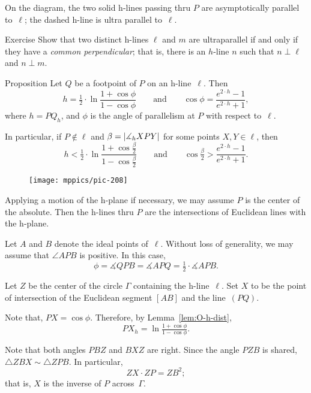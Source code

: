 On the diagram, the two solid h-lines passing thru $P$ are asymptotically parallel to~$\ell$;
the dashed h-line is ultra parallel to~$\ell$.


\begin{thm}{Exercise}\label{ex:ultra-parallel}
Show that two distinct h-lines $\ell$ and $m$ are ultraparallel if and only if they have a {}\emph{common perpendicular};
that is, there is an $h$-line $n$ such that $n\perp \ell$ and $n\perp m$.
\end{thm}


\begin{thm}{Proposition}\label{prop:angle-parallelism}
Let $Q$ be a footpoint of $P$ on an h-line~$\ell$.
Then
\[h=\tfrac12\cdot\ln \frac{1+\cos\phi}{1-\cos\phi}
\qquad\text{and}\qquad
\cos\phi=\frac{e^{2\cdot h}-1}{e^{2\cdot h}+1},\]
where $h=PQ_h$, and $\phi$ is the angle of parallelism at $P$ with respect to~$\ell$.

In particular, if $P\notin\ell$ and $\beta=|\measuredangle_h XPY|$ for some points $X,Y\in\ell$, then 
\[
h<\tfrac12\cdot\ln \frac{1+\cos\tfrac\beta2}{1-\cos\tfrac\beta2}
\qquad\text{and}\qquad
\cos\tfrac\beta2>\frac{e^{2\cdot h}-1}{e^{2\cdot h}+1}.\]

\end{thm}

\begin{wrapfigure}{o}{50mm}
\vskip-6mm
\centering
\texttt{[image: mppics/pic-208]}
\end{wrapfigure}


 Applying a motion of the h-plane if necessary,
we may assume $P$ is the center of the absolute.
Then the h-lines thru $P$ are the intersections of Euclidean lines with the h-plane.

Let $A$ and $B$ denote the ideal points of~$\ell$.
Without loss of generality, we may assume that $\angle APB$ 
is positive.
In this case, 
$$\phi=\measuredangle QPB=\measuredangle APQ=\tfrac12 \cdot\measuredangle APB.$$

Let $Z$ be the center of the circle $\Gamma$ containing the h-line~$\ell$.
Set $X$ to be the point of intersection of the Euclidean segment $[AB]$ and the line~$(PQ)$.

Note that, $PX=\cos\phi$.
Therefore, by Lemma~\ref{lem:O-h-dist},
$$PX_h=\ln \tfrac{1+\cos\phi}{1-\cos\phi}.$$

Note that both angles $PBZ$ and $BXZ$ are right.
Since the angle $PZB$ is shared, $\triangle ZBX\sim \triangle ZPB$.
In particular, 
$$ZX\cdot ZP=ZB^2;$$
that is, $X$ is the inverse of $P$ across~$\Gamma$.

